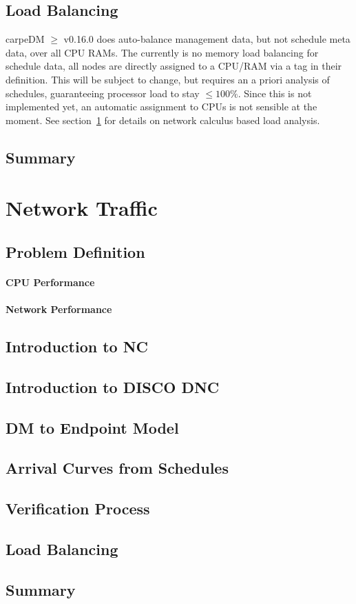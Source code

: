 \subsection{Load Balancing}
carpeDM $\ge$ v0.16.0 does auto-balance management data, but not schedule meta data, over all CPU RAMs.
The currently is no memory load balancing for schedule data, all nodes are directly assigned to a CPU/RAM via a tag in their definition.
This will be subject to change, but requires an a priori analysis of schedules, guaranteeing processor load to stay $\le100\%$. Since this is not implemented yet, an automatic assignment to CPUs is not sensible at the moment. See section~\ref{sec:nettraffic} for details on network calculus based load analysis.

\subsection{Summary}



\section{Network Traffic}
\label{sec:nettraffic}

\subsection{Problem Definition}

\paragraph{CPU Performance}

\paragraph{Network Performance}

\subsection{Introduction to NC}

\subsection{Introduction to DISCO DNC}

\subsection{DM to Endpoint Model}

\subsection{Arrival Curves from Schedules}

\subsection{Verification Process}

\subsection{Load Balancing}
\label{ssec:ncloadbalance}

\subsection{Summary}
